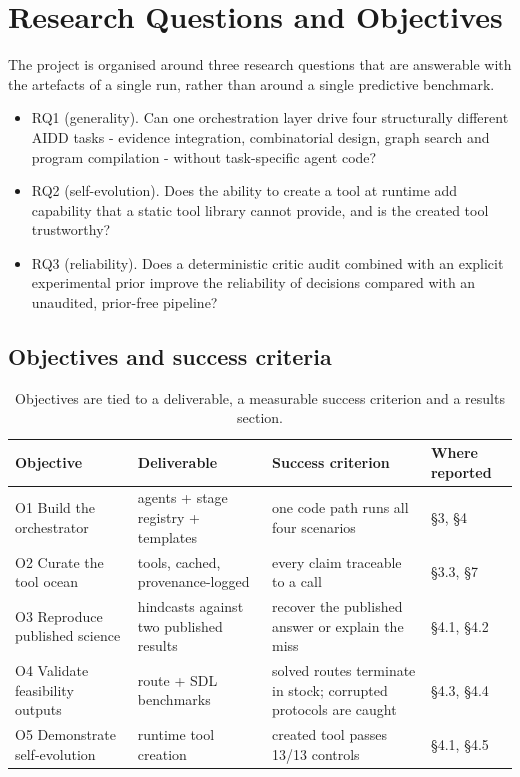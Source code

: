 \chapter{Research Questions and Objectives}\label{ch:2}

The project is organised around three research questions that are answerable with the artefacts of a single run, rather than around a single predictive benchmark.

\begin{itemize}
\setlength{\itemsep}{0pt}\setlength{\parskip}{0pt}
\item RQ1 (generality). Can one orchestration layer drive four structurally different AIDD tasks - evidence integration, combinatorial design, graph search and program compilation - without task-specific agent code?
\item RQ2 (self-evolution). Does the ability to create a tool at runtime add capability that a static tool library cannot provide, and is the created tool trustworthy?
\item RQ3 (reliability). Does a deterministic critic audit combined with an explicit experimental prior improve the reliability of decisions compared with an unaudited, prior-free pipeline?
\end{itemize}

\section{Objectives and success criteria}

\begin{table}[htbp]
\centering
\small
\caption{Objectives are tied to a deliverable, a measurable success criterion and a results section.}
\begin{tabularx}{\textwidth}{l>{\raggedright\arraybackslash}X>{\raggedright\arraybackslash}X>{\raggedright\arraybackslash}X}
\hline
Objective & Deliverable & Success criterion & Where reported \\
\hline
O1  Build the orchestrator & 4 agents + stage registry + templates & one code path runs all four scenarios & §3, §4 \\
O2  Curate the tool ocean & 46 tools, cached, provenance-logged & every claim traceable to a call & §3.3, §7 \\
O3  Reproduce published science & hindcasts against two published results & recover the published answer or explain the miss & §4.1, §4.2 \\
O4  Validate feasibility outputs & route + SDL benchmarks & solved routes terminate in stock; corrupted protocols are caught & §4.3, §4.4 \\
O5  Demonstrate self-evolution & runtime tool creation & created tool passes 13/13 controls & §4.1, §4.5 \\
\hline
\end{tabularx}

\end{table}

